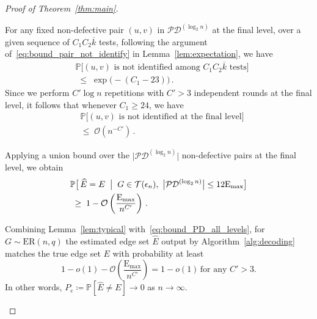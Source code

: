 \documentclass[journal]{IEEEtran}
\newcommand{\rEm}{\mathrm{E}_{\max}}
\theoremstyle{definition}
\theoremstyle{definition}
\newcommand{\Tc}{\mathcal{T}}
\newcommand{\PP}{\mathbb{P}}
\newcommand{\ER}{\mathrm{ER}}
\newcommand{\kb}{\overline{k}}
\newcommand{\bigO}{\mathcal{O}}
\begin{document}
\begin{proof}[Proof of Theorem~\ref{thm:main}]
\begin{itemize}
{For any fixed non-defective pair $(u,v)$ in $\mathcal{PD}^{(\log_2 n)}$ at the final level, over a given sequence of $C_1 C_2 \kb$ tests, following the argument of~\eqref{eq:bound_pair_not_identify} in Lemma~\ref{lem:expectation}, we have
\begin{align*}
    &\PP\big[ (u,v) \text{ is not identified among } 
       C_1 C_2\kb \text{ tests} \big] \\
    &\;\le\; \exp\big( -(C_1-23) \big) \, .
\end{align*}
Since we perform $C'\log n$ repetitions with $C'>3$ independent rounds at the final level, it follows that whenever $C_1 \ge 24$, we have
\begin{align*}
    &\PP\big[ (u,v) \text{ is not identified at the final level} \big] \\
    &\le\; \bigO(n^{-C'}) \, .
\end{align*}

Applying a union bound over the $\big|\mathcal{PD}^{(\log_2 n)}\big|$ non-defective pairs at the final level, we obtain
\begin{align}
    &\PP \big[\, \widehat{E} = E \;\bigm|\; G \in \Tc(\epsilon_n),\ 
       \big|\mathcal{PD}^{(\log_2 n)}\big| \le 12\rEm \big] \notag \\
    &\;\ge\; 1 - \bigO \left( \frac{\rEm}{n^{C'}} \right) \, .
    \label{eq:error_prob}
\end{align}

Combining Lemma~\ref{lem:typical} with~\eqref{eq:bound_PD_all_levels}, for \(G \sim \ER(n,q)\) the estimated edge set \(\widehat{E}\) output by Algorithm~\ref{alg:decoding} matches the true edge set \(E\) with probability at least
\[
1 - o(1) - \bigO \left(\frac{\rEm}{n^{C'}}\right)
= 1 - o(1) \, \text{for any } C'>3.
\]
In other words, \(P_e \coloneqq \PP[\widehat{E} \ne E] \to 0\) as \(n \to \infty\).

}
\end{itemize}
\end{proof}
\end{document}
